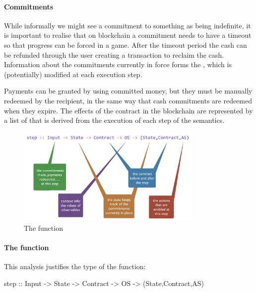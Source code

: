 \documentclass[
      acmsmall
    , screen
    , review=true
  ]{acmart}
\begin{document}
\paragraph{Commitments}


While informally we might see a commitment to something as being indefinite, it is important to realise that on blockchain a commitment needs to have a timeout so that progress can be forced in a game. After the timeout period the cash can be refunded through the user creating a transaction to reclaim the cash.
Information about the commitments currently in force forms the , which is (potentially) modified at each execution step. 

Payments can be granted by using committed money, but they must be manually redeemed by the recipient, in the 
same way that cash commitments are redeemed when they expire. The effects of the contract in the blockchain are 
represented by a list  of  that is derived from the execution of each step of the semantics.

\begin{figure}[t]
\begin{center}
\includegraphics[width=0.8\textwidth]{pix/step-type.png}
\caption{The  function}
\label{fig:step-function}
\end{center}
\end{figure}

\paragraph{The  function}


This analysis justifies the type of the  function:

\begin{haskellcode}
step :: Input -> State -> Contract -> OS -> (State,Contract,AS)
\end{haskellcode}
\end{document}
